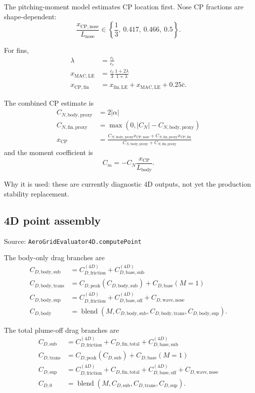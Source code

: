 \documentclass[11pt]{article}
\begin{document}
The pitching-moment model estimates CP location first. Nose CP fractions are shape-dependent:
\[
\frac{x_{\mathrm{CP,nose}}}{L_{\mathrm{nose}}}
\in \left\{
\frac{1}{3},\ 0.417,\ 0.466,\ 0.5
\right\}.
\]

For fins,
\begin{align*}
\lambda &= \frac{c_t}{c_r} \\
x_{\mathrm{MAC,LE}} &= \frac{c_r}{3}\frac{1+2\lambda}{1+\lambda} \\
x_{\mathrm{CP,fin}} &= x_{\mathrm{fin,LE}} + x_{\mathrm{MAC,LE}} + 0.25\bar c.
\end{align*}

The combined CP estimate is
\begin{align*}
C_{N,\mathrm{body,proxy}} &= 2|\alpha| \\
C_{N,\mathrm{fin,proxy}} &= \max(0, |C_N| - C_{N,\mathrm{body,proxy}}) \\
x_{\mathrm{CP}} &= \frac{C_{N,\mathrm{body,proxy}}x_{\mathrm{CP,nose}} + C_{N,\mathrm{fin,proxy}}x_{\mathrm{CP,fin}}}
{C_{N,\mathrm{body,proxy}}+C_{N,\mathrm{fin,proxy}}}
\end{align*}
and the moment coefficient is
\begin{equation*}
C_m = -C_N\frac{x_{\mathrm{CP}}}{L_{\mathrm{body}}}.
\end{equation*}

Why it is used: these are currently diagnostic 4D outputs, not yet the production stability replacement.

\subsection{4D point assembly}
Source: \texttt{AeroGridEvaluator4D.computePoint}

The body-only drag branches are
\begin{align*}
C_{D,\mathrm{body,sub}} &= C_{D,\mathrm{friction}}^{(4D)} + C_{D,\mathrm{base,sub}}^{(4D)} \\
C_{D,\mathrm{body,trans}} &= C_{D,\mathrm{peak}}(C_{D,\mathrm{body,sub}}) + C_{D,\mathrm{base}}(M=1) \\
C_{D,\mathrm{body,sup}} &= C_{D,\mathrm{friction}}^{(4D)} + C_{D,\mathrm{base,off}}^{(4D)} + C_{D,\mathrm{wave,nose}} \\
C_{D,\mathrm{body}} &= \operatorname{blend}(M,C_{D,\mathrm{body,sub}},C_{D,\mathrm{body,trans}},C_{D,\mathrm{body,sup}}).
\end{align*}

The total plume-off drag branches are
\begin{align*}
C_{D,\mathrm{sub}} &= C_{D,\mathrm{friction}}^{(4D)} + C_{D,\mathrm{fin,total}} + C_{D,\mathrm{base,sub}}^{(4D)} \\
C_{D,\mathrm{trans}} &= C_{D,\mathrm{peak}}(C_{D,\mathrm{sub}}) + C_{D,\mathrm{base}}(M=1) \\
C_{D,\mathrm{sup}} &= C_{D,\mathrm{friction}}^{(4D)} + C_{D,\mathrm{fin,total}} + C_{D,\mathrm{base,off}}^{(4D)} + C_{D,\mathrm{wave,nose}} \\
C_{D,0} &= \operatorname{blend}(M,C_{D,\mathrm{sub}},C_{D,\mathrm{trans}},C_{D,\mathrm{sup}}).
\end{align*}
\end{document}
